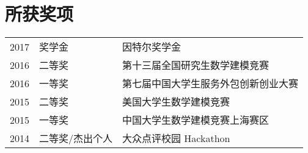 \documentclass[]{deedy-resume-openfont}
\begin{document}
\begin{minipage}[t]{0.73\textwidth}
    
    \section{所获奖项} 
    \begin{tabular}{rll}
    2017         & 奖学金  & 因特尔奖学金 \\
    2016	     & 二等奖  & 第十三届全国研究生数学建模竞赛 \\
    2016	     & 一等奖  & 第七届中国大学生服务外包创新创业大赛 \\
    2015	     & 二等奖  & 美国大学生数学建模竞赛 \\
    2015         & 一等奖 & 中国大学生数学建模竞赛上海赛区 \\
    2014	     & 二等奖/杰出个人  & 大众点评校园 Hackathon \\
    \end{tabular}
    \sectionsep
    
    
    
    \end{minipage} 
    
\end{document}
